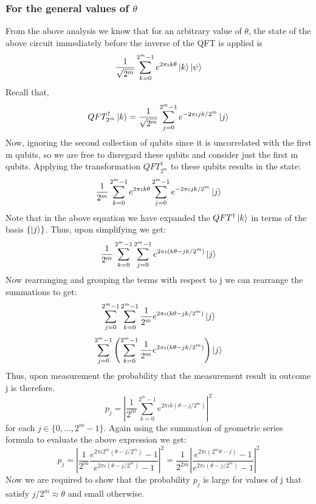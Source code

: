 \subsubsection{For the general values of $\theta$}
From the above analysis we know that for an arbitrary value of $\theta$, the state of the above circuit immediately before the inverse of the QFT is applied is
\[
\frac{1}{\sqrt{2^m}}\sum_{k=0}^{2^m-1}e^{2\pi\iota k\theta}\ket{k}\ket{\psi}
\]
Recall that,
\[
QFT_{2^m}^{\dagger}\ket{k}=\frac{1}{\sqrt{2^m}}\sum_{j=0}^{2^m-1}e^{-2\pi \iota jk/2^m} \ket{j}
\]
Now, ignoring the second collection of qubits since it is uncorrelated with the first m qubits, so we are free to disregard these qubits and consider just the first m qubits. Applying the transformation $QFT_{2^m}^{\dagger}$  to these qubits results in the state:
\[
\frac{1}{2^m}\sum_{k=0}^{2^m-1}e^{2\pi\iota k\theta}\sum_{j=0}^{2^m-1}e^{-2\pi\iota jk/2^m}\ket{j}
\]
Note that in the above equation we have expanded the $QFT^{\dagger}\ket{k}$ in terms of the basis $\{\ket{j}\}$.
Thus, upon simplifying we get:
\[
\frac{1}{2^m}\sum_{k=0}^{2^m-1}\sum_{j=0}^{2^m-1} e^{2\pi\iota(k\theta-jk/2^m)}\ket{j}
\]
Now rearranging and grouping the terms with respect to j we can rearrange the summations to get:
\[
\sum_{j=0}^{2^m-1}\sum_{k=0}^{2^m-1}\frac{1}{2^m}e^{2\pi\iota(k\theta-jk/2^m)}\ket{j}
\]
\[
    \sum_{j=0}^{2^m-1}\left(\sum_{k=0}^{2^m-1}\frac{1}{2^m}e^{2\pi\iota(k\theta-jk/2^m)}\right)\ket{j}
\]
Thus, upon measurement the probability that the measurement result in outcome j is therefore.
\[
p_j=\left|\frac{1}{2^m}\sum_{k=0}^{2^m-1}e^{2\pi\iota k(\theta-j/2^m)}\right|^2
\]
for each $j \in \{0,\ldots,2^m-1\}$. 
Again using the summation of geometric series formula to evaluate the above expression we get:
\[
p_j=\left|\frac{1}{2^m}\frac{e^{2\pi\iota 2^m(\theta-j/2^m)}-1}{e^{2\pi\iota (\theta-j/2^m)}-1}\right|^2=\frac{1}{2^{2m}}\left|\frac{e^{2\pi\iota(2^m\theta-j)}-1}{e^{2\pi\iota(\theta-j/2^m)}-1}\right|^2
\]
Now we are required to show that the probability $p_j$ is large for values of j that satisfy $j/2^m\approx \theta$ and small otherwise.

